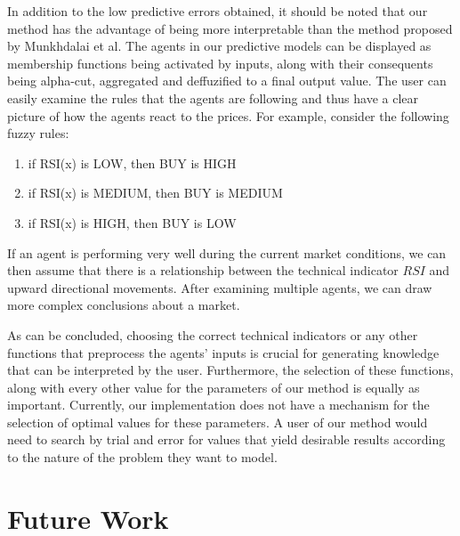 \documentclass{ieeeaccess}
\begin{document}
In addition to the low predictive errors obtained, it should be noted
that our method has the advantage of being more interpretable than the
method proposed by Munkhdalai et al. The agents in our predictive models can
be displayed as membership functions being activated by inputs,
along with their consequents being alpha-cut, aggregated and
deffuzified to a final output value. The user can easily examine the
rules that the agents are following and thus have a clear picture of
how the agents react to the prices. For example, consider the
following fuzzy rules:

\begin{enumerate}
	\item if RSI(x) is LOW, then BUY is HIGH
	\item if RSI(x) is MEDIUM, then BUY is MEDIUM
	\item if RSI(x) is HIGH, then BUY is LOW
\end{enumerate}

If an agent is performing very well during the current market
conditions, we can then assume that there is a relationship between
the technical indicator $RSI$ and upward directional movements. After
examining multiple agents, we can draw more complex conclusions about
a market.



As can be concluded, choosing the correct technical indicators or any
other functions that preprocess the agents' inputs is crucial for
generating knowledge that can be interpreted by the user. Furthermore,
the selection of these functions, along with every other value for the
parameters of our method is equally as important. Currently, our
implementation does not have a mechanism for the selection of optimal
values for these parameters. A user of our method would need to search
by trial and error for values that yield desirable results according
to the nature of the problem they want to model.

\section{Future Work}
\label{section:future-work}
\end{document}
